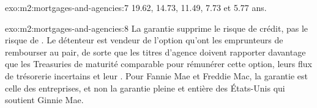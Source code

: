 \begin{solution}{exo:m2:mortgages-and-agencies:7}
19.62, 14.73, 11.49, 7.73 et 5.77 ans.
\end{solution}

\begin{solution}{exo:m2:mortgages-and-agencies:8}
La garantie supprime le risque de crédit, pas le risque de . Le
détenteur est vendeur de l'option qu'ont les emprunteurs de rembourser au pair, de sorte que les titres d'agence doivent rapporter davantage que
les Treasuries de maturité comparable pour rémunérer cette option, leurs flux de trésorerie
incertains et leur . Pour Fannie Mae et Freddie Mac, la
garantie est celle des entreprises, et non la garantie pleine et entière des
États-Unis qui soutient Ginnie Mae.
\end{solution}

